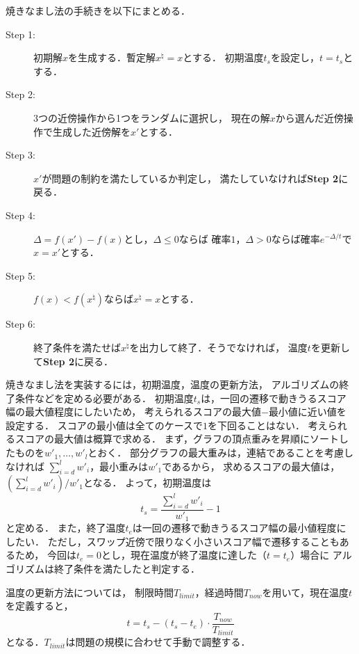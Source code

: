 焼きなまし法の手続きを以下にまとめる．
\begin{description}
  \item[Step 1:] 初期解$x$を生成する．暫定解$x^{\natural}=x$とする．
  初期温度$t_s$を設定し，$t=t_s$とする．
  \item[Step 2:] 3つの近傍操作から1つをランダムに選択し，
  現在の解$x$から選んだ近傍操作で生成した近傍解を$x'$とする．
  \item[Step 3:] $x'$が問題の制約を満たしているか判定し，
  満たしていなければ\textbf{Step 2}に戻る．
  \item[Step 4:] $\Delta=f(x')-f(x)$とし，$\Delta \leq 0$ならば
  確率$1$，$\Delta > 0$ならば確率$e^{-\Delta/t}$で$x=x'$とする．
  \item[Step 5:] $f(x)<f(x^{\natural})$ならば$x^{\natural}=x$とする．
  \item[Step 6:] 終了条件を満たせば$x^{\natural}$を出力して終了．そうでなければ，
  温度$t$を更新して\textbf{Step 2}に戻る．
\end{description}

焼きなまし法を実装するには，初期温度，温度の更新方法，
アルゴリズムの終了条件などを定める必要がある．
初期温度$t_{s}$は，一回の遷移で動きうるスコア幅の最大値程度にしたいため，
考えられるスコアの最大値$-$最小値に近い値を設定する．
スコアの最小値は全てのケースで$1$を下回ることはない．
考えられるスコアの最大値は概算で求める．
まず，グラフの頂点重みを昇順にソートしたものを$w'_1,\ldots,w'_l$とおく．
部分グラフの最大重みは，連結であることを考慮しなければ
$\sum_{i=d}^l w'_i$，最小重みは$w'_1$であるから，
求めるスコアの最大値は，$(\sum_{i=d}^l w'_i)/w'_1$となる．
よって，初期温度は$$t_s=\frac{\sum_{i=d}^l w'_i}{w'_1}- 1$$と定める．
また，終了温度$t_e$は一回の遷移で動きうるスコア幅の最小値程度にしたい．
ただし，スワップ近傍で限りなく小さいスコア幅で遷移することもあるため，
今回は$t_e=0$とし，現在温度が終了温度に達した（$t=t_e$）場合に
アルゴリズムは終了条件を満たしたと判定する．

温度の更新方法については，
制限時間$T_{limit}$，経過時間$T_{now}$を用いて，現在温度$t$を定義すると，
$$t=t_s - (t_s - t_e)\cdot \frac{T_{now}}{T_{limit}}$$
となる．$T_{limit}$は問題の規模に合わせて手動で調整する．


